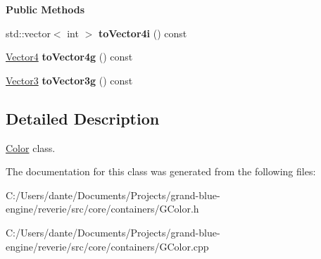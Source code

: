 \begin{Indent}\textbf{ Public Methods}\par
\begin{DoxyCompactItemize}
\item 
\mbox{\label{classrev_1_1_color_ae1bc0cbb31d40fb2cf3ed412d2c64dfe}} 
std\+::vector$<$ int $>$ {\bfseries to\+Vector4i} () const
\item 
\mbox{\label{classrev_1_1_color_a0d8f4b7435b4f366307a395ece38a04e}} 
\mbox{\hyperlink{classrev_1_1_vector}{Vector4}} {\bfseries to\+Vector4g} () const
\item 
\mbox{\label{classrev_1_1_color_ac29db0ba242fe1b6a6932964411fb67c}} 
\mbox{\hyperlink{classrev_1_1_vector}{Vector3}} {\bfseries to\+Vector3g} () const
\end{DoxyCompactItemize}
\end{Indent}


\subsection{Detailed Description}
\mbox{\hyperlink{classrev_1_1_color}{Color}} class. 

The documentation for this class was generated from the following files\+:\begin{DoxyCompactItemize}
\item 
C\+:/\+Users/dante/\+Documents/\+Projects/grand-\/blue-\/engine/reverie/src/core/containers/G\+Color.\+h\item 
C\+:/\+Users/dante/\+Documents/\+Projects/grand-\/blue-\/engine/reverie/src/core/containers/G\+Color.\+cpp\end{DoxyCompactItemize}
